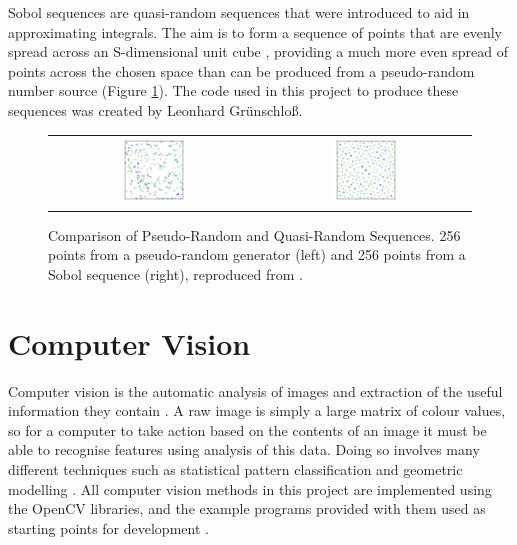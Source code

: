 Sobol sequences are quasi-random sequences that were introduced to aid in approximating integrals. The aim is to form a sequence of points that are evenly spread across an S-dimensional unit cube \cite{joe2008constructing}, providing a much more even spread of points across the chosen space than can be produced from a pseudo-random number source (Figure \ref{fig:Sobol}). The code used in this project to produce these sequences was created by Leonhard Gr\"unschlo\ss\space \cite{CodeSource}.

\begin{figure}[H]
    \begin{center}
    \begin{tabular}{ c c }
        \includegraphics[width=0.33\textwidth]{Figures/Pseudorandom_sequence_2D.png} &
        \includegraphics[width=0.33\textwidth]{Figures/Sobol_sequence_2D.png}
    \end{tabular}
    \caption[Comparison of Pseudo-Random and Quasi-Random Sequences]{Comparison of Pseudo-Random and Quasi-Random Sequences. 256 points from a pseudo-random generator (left) and 256 points from a Sobol sequence (right), reproduced from \cite{SobolWiki}.}
    \label{fig:Sobol}
    \end{center}
\end{figure}

\section{Computer Vision}

Computer vision is the automatic analysis of images and extraction of the useful information they contain \cite{CVDef}. A raw image is simply a large matrix of colour values, so for a computer to take action based on the contents of an image it must be able to recognise features using analysis of this data. Doing so involves many different techniques such as statistical pattern classification and geometric modelling \cite{ballard1982computer}. All computer vision methods in this project are implemented using the OpenCV libraries, and the example programs provided with them used as starting points for development \cite{OpenCV}.

